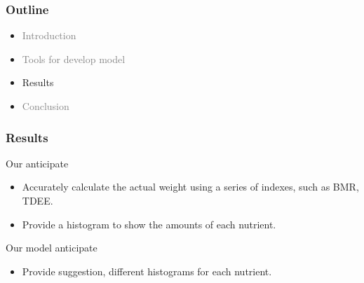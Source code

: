 \documentclass[fleqn]{beamer}
\begin{document}
\begin{frame}
\frametitle{Outline}
\begin{itemize}
        \item \textcolor{gray}{Introduction}
        \vspace{0.15 cm}
        \item \textcolor{gray}{Tools for develop model}
        \vspace{0.15 cm}
        \item Results
        \vspace{0.15 cm}
        \item \textcolor{gray}{Conclusion}
        \vspace{0.15 cm}
\end{itemize}
\end{frame}
\begin{frame}
\frametitle{Results}
     \begin{minipage}[t]{0.48\textwidth}
        \begin{block}{Our anticipate}
            \begin{itemize}
                \item Accurately calculate the actual weight using a series of indexes, such as BMR, TDEE. \\
                \item Provide a histogram to show the amounts of each nutrient. 
            \end{itemize}
        \end{block}
    \end{minipage}%
    \hfill
    \begin{minipage}[t]{0.48\textwidth}
        \begin{block}{Our model anticipate}
            \begin{itemize}
                \item Provide suggestion, different histograms for each nutrient.
            \end{itemize}
        \end{block}
\end{minipage}
\end{frame}
\end{document}
